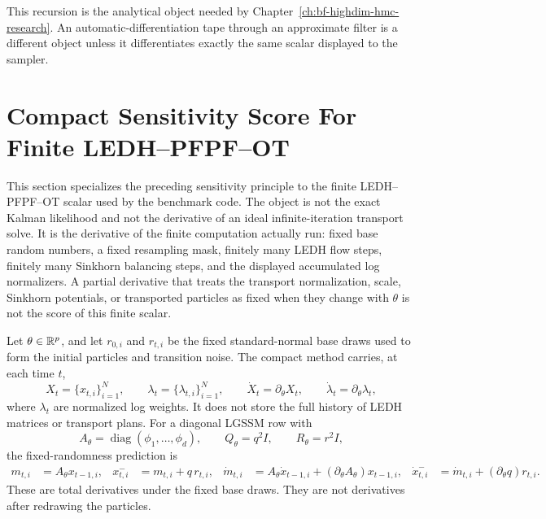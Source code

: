 This recursion is the analytical object needed by Chapter~\ref{ch:bf-highdim-hmc-research}.
An automatic-differentiation tape through an approximate filter is a different
object unless it differentiates exactly the same scalar displayed to the
sampler.

\section{Compact Sensitivity Score For Finite LEDH--PFPF--OT}
\label{sec:bf-hd-ledh-compact-sensitivity-score}

This section specializes the preceding sensitivity principle to the finite
LEDH--PFPF--OT scalar used by the benchmark code.  The object is not the exact
Kalman likelihood and not the derivative of an ideal infinite-iteration
transport solve.  It is the derivative of the finite computation actually run:
fixed base random numbers, a fixed resampling mask, finitely many LEDH flow
steps, finitely many Sinkhorn balancing steps, and the displayed accumulated
log normalizers.  A partial derivative that treats the transport
normalization, scale, Sinkhorn potentials, or transported particles as fixed
when they change with \(\theta\) is not the score of this finite scalar.

Let \(\theta\in\mathbb{R}^p\), and let \(r_{0,i}\) and \(r_{t,i}\) be the fixed
standard-normal base draws used to form the initial particles and transition
noise.  The compact method carries, at each time \(t\),
\[
  X_t=\{x_{t,i}\}_{i=1}^N,\qquad
  \lambda_t=\{\lambda_{t,i}\}_{i=1}^N,\qquad
  \dot X_t=\partial_\theta X_t,\qquad
  \dot\lambda_t=\partial_\theta \lambda_t,
\]
where \(\lambda_t\) are normalized log weights.  It does not store the full
history of LEDH matrices or transport plans.  For a diagonal LGSSM row with
\begin{equation}
  A_\theta=\operatorname{diag}(\phi_1,\ldots,\phi_d),\qquad
  Q_\theta=q^2 I,\qquad
  R_\theta=r^2 I,
\end{equation}
the fixed-randomness prediction is
\begin{align}
  m_{t,i} &= A_\theta x_{t-1,i},&
  x^-_{t,i} &= m_{t,i}+q\,r_{t,i},&
  \dot m_{t,i} &= A_\theta\dot x_{t-1,i}
    +(\partial_\theta A_\theta)x_{t-1,i},&
  \dot x^-_{t,i} &= \dot m_{t,i}+(\partial_\theta q)r_{t,i}.
  \label{eq:bf-hd-ledh-compact-prediction-sensitivity}
\end{align}
These are total derivatives under the fixed base draws.  They are not
derivatives after redrawing the particles.

